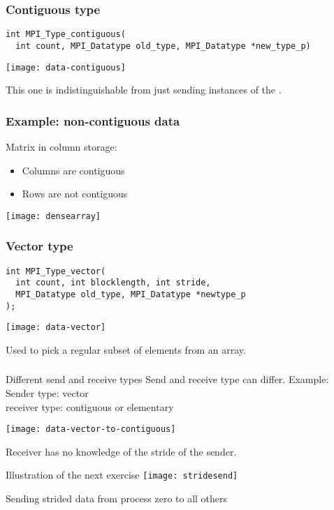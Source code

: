 \begin{frame}[containsverbatim]\frametitle{Contiguous type}
\lstset{language=C}
\begin{lstlisting}
int MPI_Type_contiguous(
  int count, MPI_Datatype old_type, MPI_Datatype *new_type_p)  
\end{lstlisting}
  \texttt{[image: data-contiguous]}

This one is indistinguishable from just sending  instances
of the .
\end{frame}

\begin{frame}[containsverbatim]\frametitle{Example: non-contiguous data}
  Matrix in column storage:
  \begin{itemize}
  \item Columns are contiguous
  \item Rows are not contiguous
  \end{itemize}
  \texttt{[image: densearray]}
\end{frame}

\begin{frame}[containsverbatim]\frametitle{Vector type}
\begin{lstlisting}
int MPI_Type_vector(
  int count, int blocklength, int stride,
  MPI_Datatype old_type, MPI_Datatype *newtype_p
);  
\end{lstlisting}
  \texttt{[image: data-vector]}

Used to pick a regular subset of elements from an array.
\end{frame}

\begin{frame}[containsverbatim]\frametitle{}
\end{frame}

\begin{frame}{Different send and receive types}
  Send and receive type can differ. Example:\\
  Sender type: vector\\ receiver type: contiguous or elementary

  \texttt{[image: data-vector-to-contiguous]}

  Receiver has no knowledge of the stride of the sender.
\end{frame}

\begin{frame}{Illustration of the next exercise}
  \label{fig:stridesend}
  \texttt{[image: stridesend]}

  Sending strided data from process zero to all others
\end{frame}

